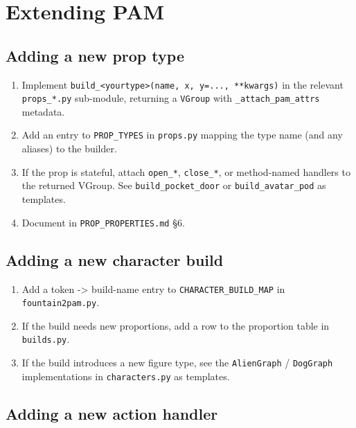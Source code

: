 \documentclass[
  12pt,
  letterpaper,
]{book}
\providecommand{\tightlist}{%
  \setlength{\itemsep}{0pt}\setlength{\parskip}{0pt}}
\begin{document}
\section{Extending PAM}\label{extending-pam}

\subsection{Adding a new prop type}\label{adding-a-new-prop-type}

\begin{enumerate}
\def\labelenumi{\arabic{enumi}.}
\tightlist
\item
  Implement
  \texttt{build\_\textless{}yourtype\textgreater{}(name,\ x,\ y=...,\ **kwargs)}
  in the relevant \texttt{props\_*.py} sub-module, returning a
  \texttt{VGroup} with \texttt{\_attach\_pam\_attrs} metadata.
\item
  Add an entry to \texttt{PROP\_TYPES} in \texttt{props.py} mapping the
  type name (and any aliases) to the builder.
\item
  If the prop is stateful, attach \texttt{open\_*}, \texttt{close\_*},
  or method-named handlers to the returned VGroup. See
  \texttt{build\_pocket\_door} or \texttt{build\_avatar\_pod} as
  templates.
\item
  Document in \texttt{PROP\_PROPERTIES.md} §6.
\end{enumerate}

\subsection{Adding a new character
build}\label{adding-a-new-character-build}

\begin{enumerate}
\def\labelenumi{\arabic{enumi}.}
\tightlist
\item
  Add a token -\textgreater{} build-name entry to
  \texttt{CHARACTER\_BUILD\_MAP} in \texttt{fountain2pam.py}.
\item
  If the build needs new proportions, add a row to the proportion table
  in \texttt{builds.py}.
\item
  If the build introduces a new figure type, see the \texttt{AlienGraph}
  / \texttt{DogGraph} implementations in \texttt{characters.py} as
  templates.
\end{enumerate}

\subsection{Adding a new action
handler}\label{adding-a-new-action-handler}
\end{document}
